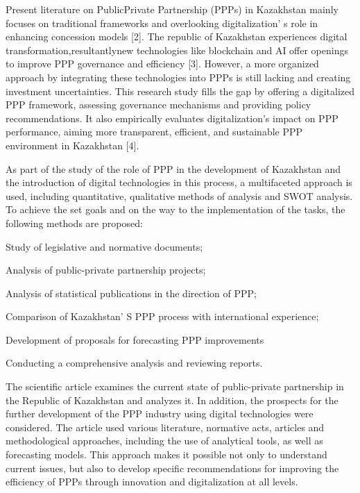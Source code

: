 \begin{multicols}{2}
Present literature on PublicPrivate Partnership (PPPs) in Kazakhstan
mainly focuses on traditional frameworks and overlooking
digitalization' s role in enhancing concession models
{[}2{]}. The republic of Kazakhstan experiences digital
transformation,resultantlynew technologies like blockchain and AI offer
openings to improve PPP governance and efficiency {[}3{]}. However, a
more organized approach by integrating these technologies into PPPs is
still lacking and creating investment uncertainties. This research study
fills the gap by offering a digitalized PPP framework, assessing
governance mechanisms and providing policy recommendations. It also
empirically evaluates digitalization's impact on PPP performance, aiming
more transparent, efficient, and sustainable PPP environment in
Kazakhstan {[}4{]}.

 As part of the study of the role of PPP
in the development of Kazakhstan and the introduction of digital
technologies in this process, a multifaceted approach is used, including
quantitative, qualitative methods of analysis and SWOT analysis. To
achieve the set goals and on the way to the implementation of the tasks,
the following methods are proposed:

Study of legislative and normative documents;

Analysis of public-private partnership projects;

Analysis of statistical publications in the direction of PPP;

Comparison of Kazakhstan' S PPP process with
international experience;

Development of proposals for forecasting PPP improvements

Conducting a comprehensive analysis and reviewing reports.

The scientific article examines the current state of public-private
partnership in the Republic of Kazakhstan and analyzes it. In addition,
the prospects for the further development of the PPP industry using
digital technologies were considered. The article used various
literature, normative acts, articles and methodological approaches,
including the use of analytical tools, as well as forecasting models.
This approach makes it possible not only to understand current issues,
but also to develop specific recommendations for improving the
efficiency of PPPs through innovation and digitalization at all levels.


\end{multicols}
